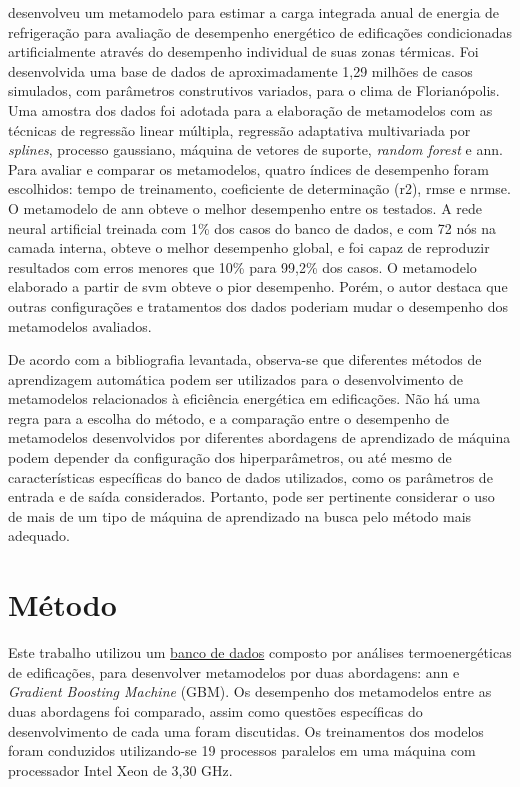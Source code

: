 \documentclass{article}
\begin{document}
\citet{Versage2015} desenvolveu um metamodelo para estimar a carga integrada anual de energia de refrigeração para avaliação de desempenho energético de edificações condicionadas artificialmente através do desempenho individual de suas zonas térmicas. Foi desenvolvida uma base de dados de aproximadamente 1,29 milhões de casos simulados, com parâmetros construtivos variados, para o clima de Florianópolis. Uma amostra dos dados foi adotada para a elaboração de metamodelos com as técnicas de regressão linear múltipla, regressão adaptativa multivariada por \textit{splines}, processo gaussiano, máquina de vetores de suporte, \textit{random forest} e \acrlong{ann}. Para avaliar e comparar os metamodelos, quatro índices de desempenho foram escolhidos: tempo de treinamento, coeficiente de determinação (\acrshort{r2}), \acrshort{rmse} e \acrfull{nrmse}. O metamodelo de \acrshort{ann} obteve o melhor desempenho entre os testados. A rede neural artificial treinada com 1\% dos casos do banco de dados, e com 72 nós na camada interna, obteve o melhor desempenho global, e foi capaz de reproduzir resultados com erros menores que 10\% para 99,2\% dos casos. O metamodelo elaborado a partir de \acrshort{svm} obteve o pior desempenho. Porém, o autor destaca que outras configurações e tratamentos dos dados poderiam mudar o desempenho dos metamodelos avaliados.

De acordo com a bibliografia levantada, observa-se que diferentes métodos de aprendizagem automática podem ser utilizados para o desenvolvimento de metamodelos relacionados à eficiência energética em edificações. 
Não há uma regra para a escolha do método, e a comparação entre o desempenho de metamodelos desenvolvidos por diferentes abordagens de aprendizado de máquina  podem depender da configuração dos hiperparâmetros, ou até mesmo de características específicas do banco de dados utilizados, como os parâmetros de entrada e de saída considerados.
Portanto, pode ser pertinente considerar o uso de mais de um tipo de máquina de aprendizado na busca pelo método mais adequado.

\section{Método} %

Este trabalho utilizou um \href{https://drive.google.com/uc?export=download&id=1XROGI9ZaUX711MjWiyEMv4U84lZFUcGW}{banco de dados} composto por análises termoenergéticas de edificações, para desenvolver metamodelos por duas abordagens: \acrfull{ann} e \textit{Gradient Boosting Machine} (GBM).
Os desempenho dos metamodelos entre as duas abordagens foi comparado, assim como questões específicas do desenvolvimento de cada uma foram discutidas.
Os treinamentos dos modelos foram conduzidos utilizando-se 19 processos paralelos em uma máquina com processador Intel Xeon de 3,30 GHz.
\end{document}
